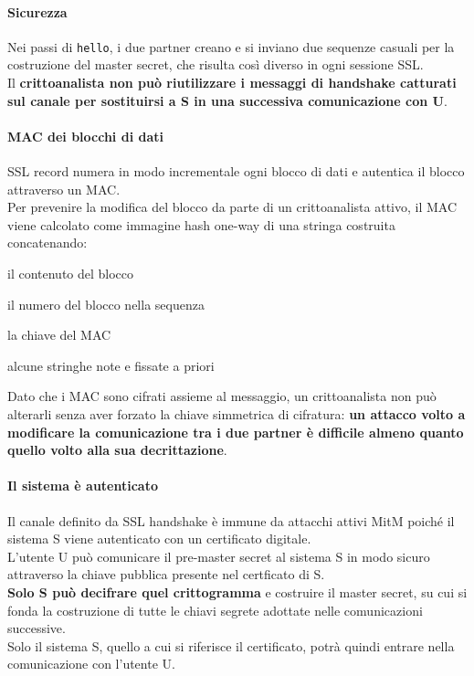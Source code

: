 \documentclass[10pt]{book}
\begin{document}
\paragraph{Sicurezza} Nei passi di \texttt{hello}, i due partner creano e si inviano due sequenze casuali per la costruzione del master secret, che risulta così diverso in ogni sessione SSL.\\
Il \textbf{crittoanalista non può riutilizzare i messaggi di handshake catturati sul canale per sostituirsi a S in una successiva comunicazione con U}.
\paragraph{MAC dei blocchi di dati} SSL record numera in modo incrementale ogni blocco di dati e autentica il blocco attraverso un MAC.\\
Per prevenire la modifica del blocco da parte di un crittoanalista attivo, il MAC viene calcolato come immagine hash one-way di una stringa costruita concatenando:
\begin{list}{}{}
	\item il contenuto del blocco
	\item il numero del blocco nella sequenza
	\item la chiave del MAC
	\item alcune stringhe note e fissate a priori
\end{list}
Dato che i MAC sono cifrati assieme al messaggio, un crittoanalista non può alterarli senza aver forzato la chiave simmetrica di cifratura: \textbf{un attacco volto a modificare la comunicazione tra i due partner è difficile almeno quanto quello volto alla sua decrittazione}.
\paragraph{Il sistema è autenticato} Il canale definito da SSL handshake è immune da attacchi attivi MitM poiché il sistema S viene autenticato con un certificato digitale.\\
L'utente U può comunicare il pre-master secret al sistema S in modo sicuro attraverso la chiave pubblica presente nel certficato di S.\\
\textbf{Solo S può decifrare quel crittogramma} e costruire il master secret, su cui si fonda la costruzione di tutte le chiavi segrete adottate nelle comunicazioni successive.\\
Solo il sistema S, quello a cui si riferisce il certificato, potrà quindi entrare nella comunicazione con l'utente U.
\end{document}
